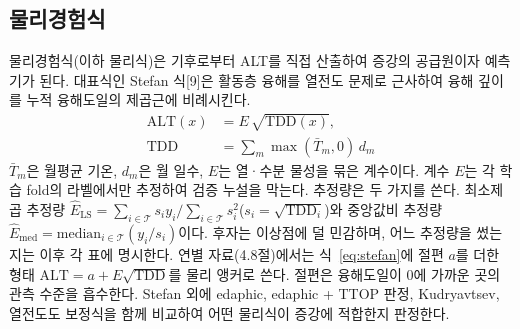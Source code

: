 \documentclass[10pt,twocolumn]{article}
\begin{document}
\subsection{물리경험식}
물리경험식(이하 물리식)은 기후로부터 ALT를 직접 산출하여 증강의 공급원이자 예측기가 된다. 대표식인 Stefan 식[9]은 활동층 융해를 열전도 문제로 근사하여 융해 깊이를 누적 융해도일의 제곱근에 비례시킨다.
\begin{equation}
\begin{aligned}
\mathrm{ALT}(x)&=E\,\sqrt{\mathrm{TDD}(x)},\\
\mathrm{TDD}&=\sum_{m}\max(\bar T_m,0)\,d_m
\end{aligned}
\label{eq:stefan}
\end{equation}
$\bar T_m$은 월평균 기온, $d_m$은 월 일수, $E$는 열·수분 물성을 묶은 계수이다. 계수 $E$는 각 학습 fold의 라벨에서만 추정하여 검증 누설을 막는다. 추정량은 두 가지를 쓴다. 최소제곱 추정량 $\hat E_{\mathrm{LS}}=\sum_{i\in\mathcal T}s_i y_i/\sum_{i\in\mathcal T}s_i^2$($s_i=\sqrt{\mathrm{TDD}_i}$)와 중앙값비 추정량 $\hat E_{\mathrm{med}}=\mathrm{median}_{i\in\mathcal T}(y_i/s_i)$이다. 후자는 이상점에 덜 민감하며, 어느 추정량을 썼는지는 이후 각 표에 명시한다. 연별 자료(4.8절)에서는 식~\eqref{eq:stefan}에 절편 $a$를 더한 형태 $\mathrm{ALT}=a+E\sqrt{\mathrm{TDD}}$를 물리 앵커로 쓴다. 절편은 융해도일이 0에 가까운 곳의 관측 수준을 흡수한다. Stefan 외에 edaphic, edaphic + TTOP 판정, Kudryavtsev, 열전도도 보정식을 함께 비교하여 어떤 물리식이 증강에 적합한지 판정한다.
\end{document}
